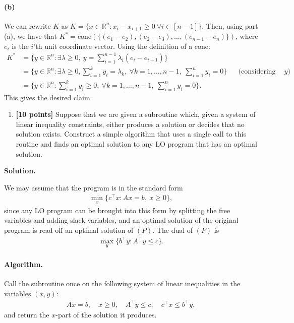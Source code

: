 \documentclass[11pt,letterpaper]{article}
\theoremstyle{definition}
\newcommand{\reals}{\mathbb{R}}
\newcommand{\cone}{\mathrm{cone}}
\newcommand{\solution}{\medskip\noindent\textbf{Solution.}\par\medskip}
\begin{document}
\paragraph{(b)}
We can rewrite $K$ as $K = \{x\in \reals^n: x_i-x_{i+1}\geq 0\  \forall i\in [n-1]\}$.
Then, using part (a), we have that $K^* = \cone(\{(e_1-e_2),(e_2-e_3),\dots,(e_{n-1}-e_n)\})$, where $e_i$ is the $i$'th unit coordinate vector.
Using the definition of a cone:
\begin{align*}
    K^* &= \{y\in\reals^n: \exists \lambda\geq 0,\ y=\sum_{i=1}^{n-1} \lambda_i(e_i - e_{i+1})\} \\
    &= \{y\in\reals^n: \exists \lambda\geq 0,\sum_{i=1}^k y_i = \lambda_k, \ \forall k = 1, \ldots, n-1, \ \sum_{i=1}^n y_i = 0\} &&\text{(considering the sum of each prefix of }y) \\
    &= \{y\in\reals^n: \sum_{i=1}^k y_i \geq 0, \ \forall k = 1, \ldots, n-1, \ \sum_{i=1}^n y_i = 0\}.
\end{align*}
This gives the desired claim.

\begin{enumerate}[resume=q]
\item \textbf{[10 points]} Suppose that we are given a subroutine which, given a system of linear inequality constraints, either produces a solution or decides that no solution exists. Construct a simple algorithm that uses a single call to this routine and finds an optimal solution to any LO program that has an optimal solution.
\end{enumerate}

\solution

We may assume that the program is in the standard form
\begin{align*}
    \min_x\{c^\top x : Ax = b,\ x\geq 0\},\tag{$P$}
\end{align*}
since any LO program can be brought into this form by splitting the free variables and adding slack variables, and an optimal solution of the original program is read off an optimal solution of $(P)$.
The dual of $(P)$ is
\begin{align*}
    \max_y\{b^\top y : A^\top y\leq c\}.\tag{$D$}
\end{align*}

\paragraph{Algorithm.}
Call the subroutine once on the following system of linear inequalities in the variables $(x,y)$:
\begin{align*}
    Ax = b,\quad x\geq 0,\quad A^\top y\leq c,\quad c^\top x\leq b^\top y,\tag{$S$}
\end{align*}
and return the $x$-part of the solution it produces.
\end{document}

